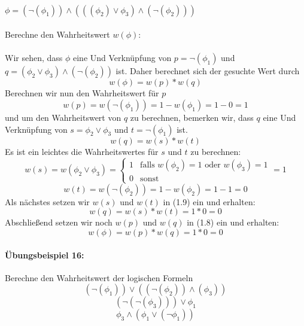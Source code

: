 \documentclass[11pt,a4paper,leqno]{report}
\numberwithin{equation}{chapter}
\begin{document}
\\
$\phi = (\neg(\phi_1))\wedge(((\phi_2)\vee\phi_3)\wedge(\neg(\phi_2)))$\\
\\
Berechne den Wahrheitswert $w(\phi)$:\\
\\
Wir sehen, dass $\phi$ eine Und Verknüpfung von $p=\neg(\phi_1)$ und\\ $q=(\phi_2\vee\phi_3)\wedge(\neg(\phi_2))$ ist. Daher berechnet sich der gesuchte Wert durch
\begin{equation}
	w(\phi) = w(p) * w(q)
\end{equation}
Berechnen wir nun den Wahrheitswert für $p$
$$w(p) = w(\neg(\phi_1)) = 1 - w(\phi_1) = 1 - 0 = 1$$
und um den Wahrheitswert von $q$ zu berechnen, bemerken wir, dass $q$ eine Und Verknüpfung von $s=\phi_2\vee\phi_3$ und $t=\neg(\phi_1)$ ist.
\begin{equation}
	w(q) = w(s) * w(t)
\end{equation}
Es ist ein leichtes die Wahrheitswertes für $s$ und $t$ zu berechnen:
$$w(s) = w(\phi_2\vee\phi_3) = 
\begin{cases} 
1 & \text{falls }w(\phi_2)=1\text{ oder }w(\phi_3)=1\\
0 & \text{sonst}
\end{cases} = 1$$
$$w(t)=w(\neg(\phi_2)) = 1 - w(\phi_2) = 1 - 1 = 0$$
Als nächstes setzen wir $w(s)$ und $w(t)$ in (1.9) ein und erhalten:
$$w(q) = w(s) * w(t) = 1 * 0 = 0$$
Abschließend setzen wir noch $w(p)$ und $w(q)$ in (1.8) ein und erhalten:
$$w(\phi) = w(p) * w(q) = 1 * 0 = 0$$
\paragraph{Übungsbeispiel 16:} Berechne den Wahrheitswert der logischen Formeln $$(\neg(\phi_1))\vee((\neg(\phi_2))\wedge(\phi_3))$$ $$(\neg(\neg(\phi_3)))\vee\phi_1$$
$$\phi_3\wedge(\phi_1\vee(\neg\phi_1))$$
\end{document}

